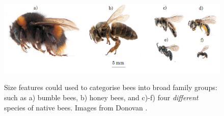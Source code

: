 \begin{figure}[!htbp]
\myfloatalign
\includegraphics[width=0.85\linewidth]{gfx2/bee_bodies} \\ 
\caption[Bee size to categorise groups.]{Size features could used to categorise bees into broad family groups: such as a) bumble bees, b) honey bees, and c)-f) four\emph{ different} species of native bees. Images from Donovan \cite[pp.130--231]{Donovan2007}.}
\label{fig:body}
\end{figure}

